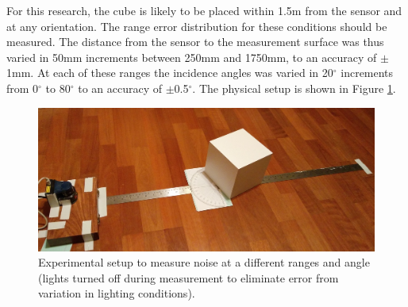 	For this research, the cube is likely to be placed within 1.5m from the sensor and at any orientation. The range error distribution for these conditions should be measured. The distance from the sensor to the measurement surface was thus varied in 50mm increments between 250mm and 1750mm, to an accuracy of $\pm$1mm. At each of these ranges the incidence angles was varied in 20$^\circ$ increments from 0$^\circ$ to 80$^\circ$ to an accuracy of $\pm$0.5$^\circ$. The physical setup is shown in Figure \ref{fig:noise_setup}.
	
	\begin{figure}
	\centering
	 	\includegraphics[width=1\textwidth,trim = 0mm 0mm 0mm 0mm,clip=true]{./Figures/noise_setup}\vspace*{0ex}
	  	\caption{Experimental setup to measure noise at a different ranges and angle (lights turned off during measurement to eliminate error from variation in lighting conditions).} \label{fig:noise_setup}
	\end{figure}
		 
